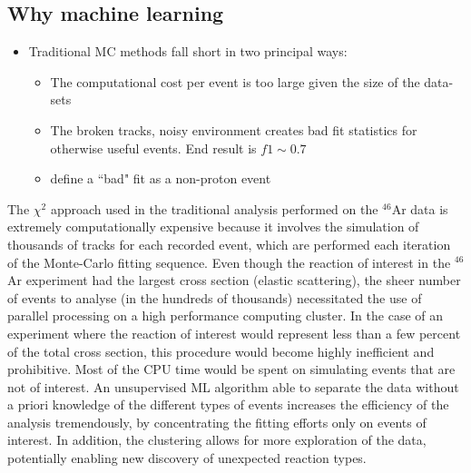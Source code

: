 \documentclass[review,number,sort&compress]{elsarticle}
\begin{document}
\subsection{Why machine learning}

\begin{itemize}
    \item Traditional MC methods fall short in two principal ways:
    \begin{itemize}
        \item The computational cost per event is too large given the size of the data-sets
        \item The broken tracks, noisy environment creates bad fit statistics for otherwise useful events. End result is $f1 \sim 0.7 $
        \item define a ``bad" fit as a non-proton event
    \end{itemize}
\end{itemize}

The $\chi^2$ approach used in the traditional analysis performed on the $^{46}$Ar data is extremely computationally expensive because it involves the simulation of thousands of tracks for each recorded event, which are performed each iteration of the Monte-Carlo fitting sequence. Even though the reaction of interest in the $^{46}$Ar experiment had the largest cross section (elastic scattering), the sheer number of events to analyse (in the hundreds of thousands) necessitated the use of parallel processing on a high performance computing cluster. In the case of an experiment where the reaction of interest would represent less than a few percent of the total cross section, this procedure would become highly inefficient and prohibitive. Most of the CPU time would be spent on simulating events that are not of interest. An unsupervised ML algorithm able to separate the data without a priori knowledge of the different types of events increases the efficiency of the analysis tremendously, by concentrating the fitting efforts only on events of interest. In addition, the clustering allows for more exploration of the data, potentially enabling new discovery of unexpected reaction types.



\end{document}
